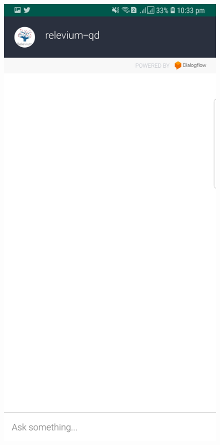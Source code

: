 \documentclass{scrreprt}
\begin{document}
\newpage
  \begin{figure}[ht!]
    \centering
    \includegraphics[height=0.6\textheight]{AppDesign/actualDesign/AgentBlank.jpg}
    \qquad

\end{figure}
\end{document}
